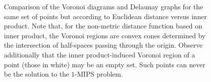 \begin{figure}[t]
    \centering
    \caption{Comparison of the Voronoi diagrams and Delaunay graphs for the same set of
    points but according to Euclidean distance versus inner product. Note that, for the non-metric
    distance function based on inner product, the Voronoi regions are convex cones determined by
    the intersection of half-spaces passing through the origin. Observe additionally that the
    inner product-induced Voronoi region of a point (those in white) may be an empty set.
    Such points can never be the solution to the $1$-MIPS problem.}
    \label{figure:graphs:ip-delaunay}
\end{figure}


